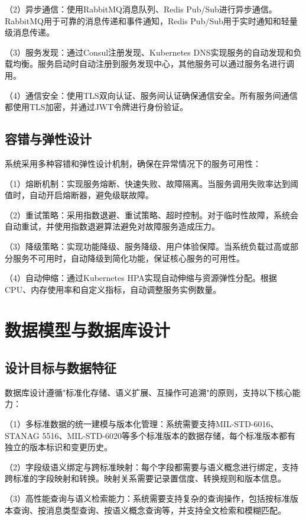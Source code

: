 （2）异步通信：使用RabbitMQ消息队列、Redis Pub/Sub进行异步通信。RabbitMQ用于可靠的消息传递和事件通知，Redis Pub/Sub用于实时通知和轻量级消息传递。

（3）服务发现：通过Consul注册发现、Kubernetes DNS实现服务的自动发现和负载均衡。服务启动时自动注册到服务发现中心，其他服务可以通过服务名进行调用。

（4）通信安全：使用TLS双向认证、服务间认证确保通信安全。所有服务间通信都使用TLS加密，并通过JWT令牌进行身份验证。

\subsection{容错与弹性设计}

系统采用多种容错和弹性设计机制，确保在异常情况下的服务可用性：

（1）熔断机制：实现服务熔断、快速失败、故障隔离。当服务调用失败率达到阈值时，自动开启熔断器，避免级联故障。

（2）重试策略：采用指数退避、重试策略、超时控制。对于临时性故障，系统会自动重试，并使用指数退避算法避免对故障服务造成压力。

（3）降级策略：实现功能降级、服务降级、用户体验保障。当系统负载过高或部分服务不可用时，自动降级到简化功能，保证核心服务的可用性。

（4）自动伸缩：通过Kubernetes HPA实现自动伸缩与资源弹性分配。根据CPU、内存使用率和自定义指标，自动调整服务实例数量。

\section{数据模型与数据库设计}

\subsection{设计目标与数据特征}

数据库设计遵循"标准化存储、语义扩展、互操作可追溯"的原则，支持以下核心能力：

（1）多标准数据的统一建模与版本化管理：系统需要支持MIL-STD-6016、STANAG 5516、MIL-STD-6020等多个标准版本的数据存储，每个标准版本都有独立的版本标识和变更历史。

（2）字段级语义绑定与跨标准映射：每个字段都需要与语义概念进行绑定，支持跨标准的字段映射和转换。映射关系需要记录置信度、转换规则和版本信息。

（3）高性能查询与语义检索能力：系统需要支持复杂的查询操作，包括按标准版本查询、按消息类型查询、按语义概念查询等，并支持全文检索和模糊匹配。

